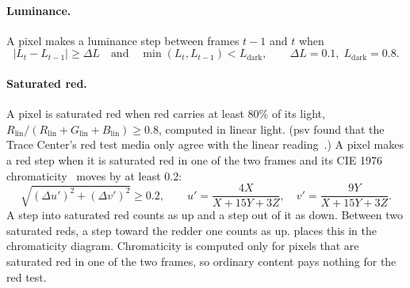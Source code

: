 \documentclass[11pt,a4paper]{article}
\newcommand{\psv}{\textsf{psv}}
\begin{document}
\paragraph{Luminance.} A pixel makes a luminance step between frames $t-1$ and $t$ when
\begin{equation}
  |L_t - L_{t-1}| \ge \Delta L \quad\text{and}\quad \min(L_t, L_{t-1}) < L_{\text{dark}},
  \qquad \Delta L = 0.1,\; L_{\text{dark}} = 0.8 .
\end{equation}

\paragraph{Saturated red.} A pixel is saturated red when red carries at least 80\% of its light, $R_{\text{lin}}/(R_{\text{lin}}+G_{\text{lin}}+B_{\text{lin}}) \ge 0.8$, computed in linear light. (\psv{} found that the Trace Center's red test media only agree with the linear reading~\cite{tracemedia}.) A pixel makes a red step when it is saturated red in one of the two frames and its CIE 1976 chromaticity~\cite{cie015} moves by at least 0.2:
\begin{equation}
  \sqrt{(\Delta u')^2 + (\Delta v')^2} \ge 0.2,\qquad
  u' = \frac{4X}{X+15Y+3Z},\quad v' = \frac{9Y}{X+15Y+3Z}.
\end{equation}
A step into saturated red counts as up and a step out of it as down. Between two saturated reds, a step toward the redder one counts as up.  places this in the chromaticity diagram. Chromaticity is computed only for pixels that are saturated red in one of the two frames, so ordinary content pays nothing for the red test.
\end{document}
